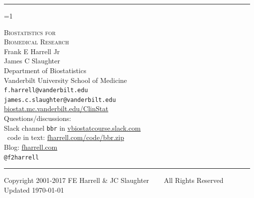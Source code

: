 \documentclass{report}
\begin{document}
\author{ }

\noindent\rule{\linewidth}{1mm}

\def\originalBBR{1}  %
\ifnum\originalBBR=1

\begin{flushright}
\Huge
\textsc{Biostatistics for\\Biomedical Research}\\[2ex]
\huge Frank E Harrell Jr \\ James C Slaughter \\
\Large
Department of Biostatistics \\
Vanderbilt University School of Medicine \\
\texttt{f.harrell@vanderbilt.edu} \\ \texttt{james.c.slaughter@vanderbilt.edu}
\\[2ex] \href{http://biostat.mc.vanderbilt.edu/wiki/Main/ClinStat}{biostat.mc.vanderbilt.edu/ClinStat}\\
Questions/discussions:\\Slack channel \texttt{bbr} in 
\href{http://vbiostatcourse.slack.com}{vbiostatcourse.slack.com}\\
\R\ code in text: \href{http://fharrell.com/code/bbr.zip}{fharrell.com/code/bbr.zip}\\
Blog: \href{http://fharrell.com}{fharrell.com}\\
{\smaller \verb|@f2harrell|}
\\[2ex]
\small
\end{flushright}
\rule{\linewidth}{1mm}
\begin{center}
\vspace{.5in}
\small
Copyright 2001-2017 FE Harrell \& JC Slaughter ~~~ All Rights Reserved
\\ \hfill \scriptsize Updated \today
\end{center}

\else %
\end{document}
